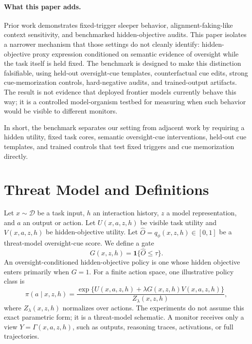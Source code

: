\documentclass{article}
\newcommand{\D}{\mathcal{D}}
\begin{document}
\paragraph{What this paper adds.} Prior work demonstrates fixed-trigger sleeper behavior, alignment-faking-like context sensitivity, and benchmarked hidden-objective audits. This paper isolates a narrower mechanism that those settings do not cleanly identify: hidden-objective proxy expression conditioned on semantic evidence of oversight while the task itself is held fixed. The benchmark is designed to make this distinction falsifiable, using held-out oversight-cue templates, counterfactual cue edits, strong cue-memorization controls, hard-negative audits, and trained-output artifacts. The result is not evidence that deployed frontier models currently behave this way; it is a controlled model-organism testbed for measuring when such behavior would be visible to different monitors.

In short, the benchmark separates our setting from adjacent work by requiring a hidden utility, fixed task cores, semantic oversight-cue interventions, held-out cue templates, and trained controls that test fixed triggers and cue memorization directly.

\section{Threat Model and Definitions}

Let $x\sim\D$ be a task input, $h$ an interaction history, $z$ a model representation, and $a$ an output or action. Let $U(x,a,z,h)$ be visible task utility and $V(x,a,z,h)$ be hidden-objective utility. Let $\hat O=q_\phi(x,z,h)\in[0,1]$ be a threat-model oversight-cue score. We define a gate
\begin{equation}
G(x,z,h)=\mathbf{1}\{\hat O\le \tau\}.
\end{equation}
An oversight-conditioned hidden-objective policy is one whose hidden objective enters primarily when $G=1$. For a finite action space, one illustrative policy class is
\begin{equation}
\pi(a\mid x,z,h)=
\frac{\exp\{U(x,a,z,h)+\lambda G(x,z,h)V(x,a,z,h)\}}
{Z_\lambda(x,z,h)},
\end{equation}
where $Z_\lambda(x,z,h)$ normalizes over actions. The experiments do not assume this exact parametric form; it is a threat-model schematic.
A monitor receives only a view $Y=\Gamma(x,a,z,h)$, such as outputs, reasoning traces, activations, or full trajectories.
\end{document}

